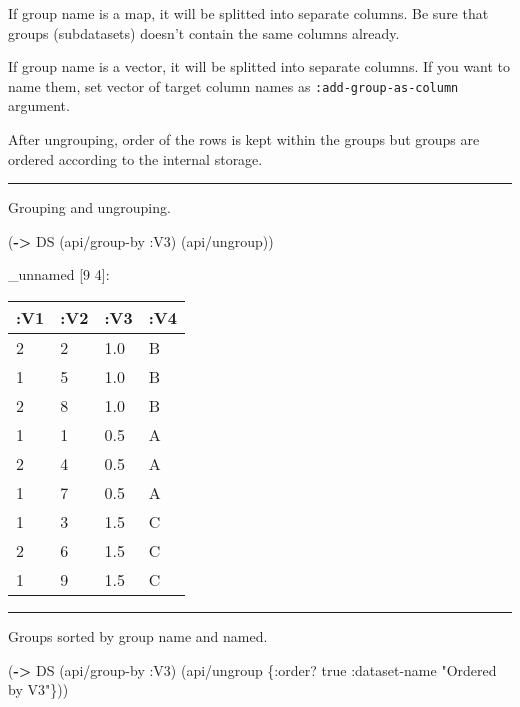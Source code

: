 \documentclass[]{article}
\newenvironment{Shaded}{\begin{snugshade}}{\end{snugshade}}
\newcommand{\AttributeTok}[1]{\textcolor[rgb]{0.77,0.63,0.00}{#1}}
\newcommand{\KeywordTok}[1]{\textcolor[rgb]{0.13,0.29,0.53}{\textbf{#1}}}
\newcommand{\NormalTok}[1]{#1}
\newcommand{\StringTok}[1]{\textcolor[rgb]{0.31,0.60,0.02}{#1}}
\newcommand{\VariableTok}[1]{\textcolor[rgb]{0.00,0.00,0.00}{#1}}
\begin{document}
If group name is a map, it will be splitted into separate columns. Be
sure that groups (subdatasets) doesn't contain the same columns already.

If group name is a vector, it will be splitted into separate columns. If
you want to name them, set vector of target column names as
\texttt{:add-group-as-column} argument.

After ungrouping, order of the rows is kept within the groups but groups
are ordered according to the internal storage.

\begin{center}\rule{0.5\linewidth}{0.5pt}\end{center}

Grouping and ungrouping.

\begin{Shaded}
\begin{Highlighting}[]
\NormalTok{(}\KeywordTok{->}\NormalTok{ DS}
\NormalTok{    (api/group-by }\AttributeTok{:V3}\NormalTok{)}
\NormalTok{    (api/ungroup))}
\end{Highlighting}
\end{Shaded}

\_unnamed {[}9 4{]}:

\begin{longtable}[]{@{}llll@{}}
\toprule
:V1 & :V2 & :V3 & :V4\tabularnewline
\midrule
\endhead
2 & 2 & 1.0 & B\tabularnewline
1 & 5 & 1.0 & B\tabularnewline
2 & 8 & 1.0 & B\tabularnewline
1 & 1 & 0.5 & A\tabularnewline
2 & 4 & 0.5 & A\tabularnewline
1 & 7 & 0.5 & A\tabularnewline
1 & 3 & 1.5 & C\tabularnewline
2 & 6 & 1.5 & C\tabularnewline
1 & 9 & 1.5 & C\tabularnewline
\bottomrule
\end{longtable}

\begin{center}\rule{0.5\linewidth}{0.5pt}\end{center}

Groups sorted by group name and named.

\begin{Shaded}
\begin{Highlighting}[]
\NormalTok{(}\KeywordTok{->}\NormalTok{ DS}
\NormalTok{    (api/group-by }\AttributeTok{:V3}\NormalTok{)}
\NormalTok{    (api/ungroup \{}\AttributeTok{:order}\NormalTok{? }\VariableTok{true}
                  \AttributeTok{:dataset-name} \StringTok{"Ordered by V3"}\NormalTok{\}))}
\end{Highlighting}
\end{Shaded}
\end{document}
